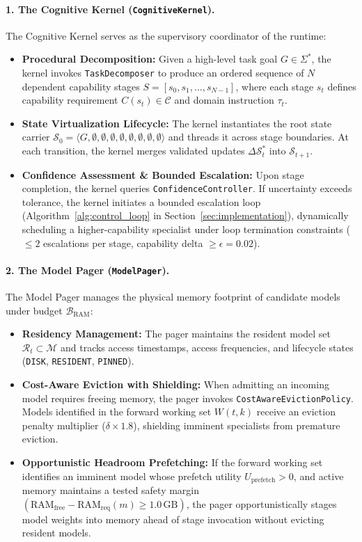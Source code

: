 \paragraph{1. The Cognitive Kernel (\texttt{CognitiveKernel}).}
The Cognitive Kernel serves as the supervisory coordinator of the runtime:
\begin{itemize}
    \item \textbf{Procedural Decomposition:} Given a high-level task goal $G \in \Sigma^*$, the kernel invokes \texttt{TaskDecomposer} to produce an ordered sequence of $N$ dependent capability stages $S = [s_0, s_1, \dots, s_{N-1}]$, where each stage $s_t$ defines capability requirement $C(s_t) \in \mathcal{C}$ and domain instruction $\tau_t$.
    \item \textbf{State Virtualization Lifecycle:} The kernel instantiates the root state carrier $\mathcal{S}_0 = \langle G, \emptyset, \emptyset, \emptyset, \emptyset, \emptyset, \emptyset, \emptyset, \emptyset \rangle$ and threads it across stage boundaries. At each transition, the kernel merges validated updates $\Delta \mathcal{S}_t^*$ into $\mathcal{S}_{t+1}$.
    \item \textbf{Confidence Assessment \& Bounded Escalation:} Upon stage completion, the kernel queries \texttt{ConfidenceController}. If uncertainty exceeds tolerance, the kernel initiates a bounded escalation loop (Algorithm~\ref{alg:control_loop} in Section~\ref{sec:implementation}), dynamically scheduling a higher-capability specialist under loop termination constraints ($\le 2$ escalations per stage, capability delta $\ge \epsilon = 0.02$).
\end{itemize}

\paragraph{2. The Model Pager (\texttt{ModelPager}).}
The Model Pager manages the physical memory footprint of candidate models under budget $\mathcal{B}_{\text{RAM}}$:
\begin{itemize}
    \item \textbf{Residency Management:} The pager maintains the resident model set $\mathcal{R}_t \subset \mathcal{M}$ and tracks access timestamps, access frequencies, and lifecycle states (\texttt{DISK}, \texttt{RESIDENT}, \texttt{PINNED}).
    \item \textbf{Cost-Aware Eviction with Shielding:} When admitting an incoming model requires freeing memory, the pager invokes \texttt{CostAwareEvictionPolicy}. Models identified in the forward working set $W(t, k)$ receive an eviction penalty multiplier ($\delta \times 1.8$), shielding imminent specialists from premature eviction.
    \item \textbf{Opportunistic Headroom Prefetching:} If the forward working set identifies an imminent model whose prefetch utility $U_{\text{prefetch}} > 0$, and active memory maintains a tested safety margin $(\text{RAM}_{\text{free}} - \text{RAM}_{\text{req}}(m) \ge 1.0\,\text{GB})$, the pager opportunistically stages model weights into memory ahead of stage invocation without evicting resident models.
\end{itemize}

